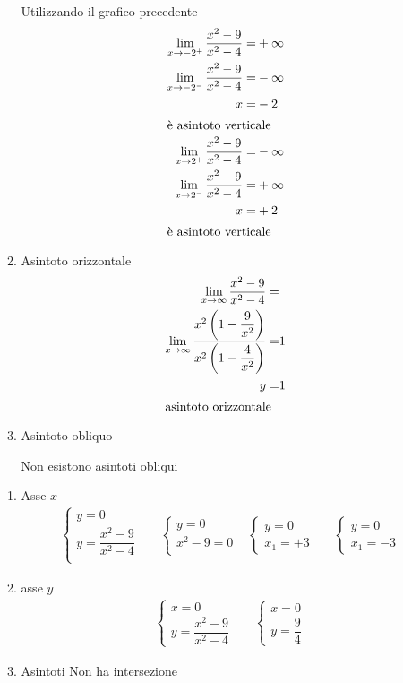 \begin{exercise}
\begin{itemize}
\begin{enumerate}
		Utilizzando il grafico precedente
		\begin{align*}
		\lim_{x\to -2^+}\dfrac{x^2-9}{x^2-4}=&+\infty\\
		\lim_{x\to -2^-}\dfrac{x^2-9}{x^2-4}=&-\infty\\
		x=&-2\\
		\intertext{è asintoto verticale}
		\lim_{x\to 2^+} \dfrac{x^2-9}{x^2-4}=&-\infty\\
		\lim_{x\to 2^-} \dfrac{x^2-9}{x^2-4}=&+\infty\\
		x=&+2\\
		\intertext{è asintoto verticale}
		\end{align*}
		\item Asintoto orizzontale 
			\begin{align*}
		\lim_{x\to \infty}\dfrac{x^2-9}{x^2-4}=&\\
		\lim_{x\to \infty}\dfrac{x^2\left(1-\dfrac{9}{x^2}\right)}{x^2\left(1-\dfrac{4}{x^2}\right)}=&1\\
		y=&1\\
		\intertext{asintoto orizzontale}
		\end{align*}
		\item Asintoto obliquo
		
		Non esistono asintoti obliqui
	\end{enumerate}
	\begin{enumerate}
		\item Asse $x$
			\begin{align*}
		&\begin{cases}
		y=0\\
		y=\dfrac{x^2-9}{x^2-4}\\
		\end{cases}
		&&\begin{cases}
		y=0\\
		x^2-9=0\\
		\end{cases}
		&\begin{cases}
		y=0\\
		x_1=+3
		\end{cases}&
		&\begin{cases}
		y=0\\
		x_1=-3
		\end{cases}
		\end{align*}
		\item asse $y$
		\begin{align*}
		&\begin{cases}
		x=0\\
		y=\dfrac{x^2-9}{x^2-4}
		\end{cases}&&\begin{cases}
		x=0\\
		y=\dfrac{9}{4}
		\end{cases}
		\end{align*}
		\item Asintoti
		Non ha intersezione
	\end{enumerate}
\end{itemize}
\end{exercise}




